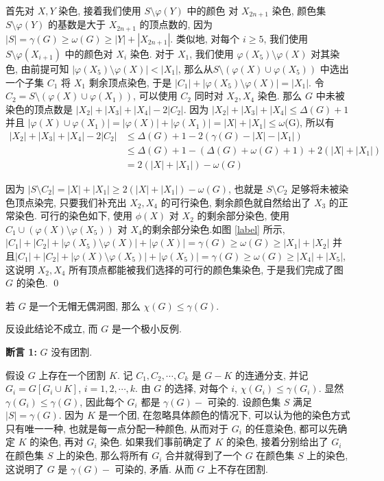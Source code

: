 \documentclass[12pt,a4paper]{article}%
\begin{document}
\begin{pf}
\begin{pf}
    首先对 $X,Y$ 染色, 接着我们使用 $S \setminus \varphi(Y)$ 中的颜色 对 $X_{2n+1}$ 染色, 颜色集 $S \setminus \varphi(Y)$ 的基数是大于 $X_{2n+1}$ 的顶点数的, 因为 $|S| = \gamma(G) \geq \omega(G) \geq |Y| + |X_{2n+1}|$. 类似地, 对每个 $i \geq 5$, 我们使用 $S \setminus \varphi(X_{i+1})$ 中的颜色对 $X_i$ 染色. 对于 $X_1$, 我们使用 $\varphi(X_5) \setminus \varphi(X)$ 对其染色, 由前提可知 $|\varphi(X_5) \setminus \varphi(X)| < |X_1|$, 那么从$S \setminus (\varphi(X) \cup \varphi(X_5))$ 中选出一个子集 $C_1$ 将 $X_1$ 剩余顶点染色, 于是 $|C_1| + |\varphi(X_5) \setminus \varphi(X)| = |X_1|$. 令 $C_2 = S \setminus (\varphi(X) \cup \varphi(X_1))$, 可以使用 $C_2$ 同时对 $X_2,X_4$ 染色. 那么 $G$ 中未被染色的顶点数是 $|X_2| + |X_3| + |X_4| - 2|C_2|$. 因为 $|X_2| + |X_3| + |X_4| \leq \Delta(G) + 1$ 并且 $|\varphi(X) \cup \varphi(X_1)| = |\varphi(X)| + |\varphi(X_1)| = |X| + |X_1| \leq \omega$(G), 所以有
    \begin{align*}
    |X_2|+|X_3|+|X_4|-2|C_2|    &\leq \Delta(G)+1-2(\gamma(G)-|X|-|X_1|)\\
                                &\leq \Delta(G)+1-(\Delta(G)+\omega(G)+1)+2(|X|+|X_1|)\\
                                &= 2(|X|+|X_1|)-\omega(G)
    \end{align*}
    
    因为 $|S \setminus C_2| = |X| + |X_1| \geq 2(|X| + |X_1|) - \omega(G)$, 也就是 $S \setminus C_2$ 足够将未被染色顶点染完, 只要我们补充出 $X_2,X_4$ 的可行染色, 剩余颜色就自然给出了 $X_3$ 的正常染色. 可行的染色如下, 使用 $\phi(X)$ 对 $X_2$ 的剩余部分染色, 使用 $C_1 \cup (\varphi(X)\setminus \varphi(X_5))$ 对 $X_4$的剩余部分染色.如图 \ref{label} 所示, $|C_1|+|C_2|+|\varphi(X_5)\setminus\varphi(X)|+|\varphi(X)|=\gamma(G)\ge\omega(G)\ge|X_1|+|X_2|$ 并且$|C_1|+|C_2|+|\varphi(X)\setminus\varphi(X_5)|+|\varphi(X_5)|=\gamma(G)\ge\omega(G)\ge|X_4|+|X_5|$, 这说明 $X_2,X_4$ 所有顶点都能被我们选择的可行的颜色集染色, 于是我们完成了图 $G$ 的染色. \qed
\end{pf}

\begin{thm}\label{thm44}
    若 $G$ 是一个无帽无偶洞图, 那么 $\chi(G) \leq \gamma(G)$.
\end{thm}
\begin{pf}
    反设此结论不成立, 而 $G$ 是一个极小反例.
    
    \textbf{断言 1:} \quad $G$ 没有团割.

    假设 $G$ 上存在一个团割 $K$. 记 $C_1,C_2,\cdots,C_k$ 是 $G-K$ 的连通分支, 并记 $G_i=G[G_i \cup K]$, $i = 1,2,\cdots,k$. 由 $G$ 的选择, 对每个 $i$, $\chi(G_i) \leq \gamma(G_i)$. 显然 $\gamma(G_i) \leq \gamma(G)$, 因此每个 $G_i$ 都是 $\gamma(G)-$ 可染的. 设颜色集 $S$ 满足 $|S| = \gamma(G)$. 因为 $K$ 是一个团, 在忽略具体颜色的情况下, 可以认为他的染色方式只有唯一一种, 也就是每一点分配一种颜色, 从而对于 $G_i$ 的任意染色, 都可以先确定 $K$ 的染色, 再对 $G_i$ 染色. 如果我们事前确定了 $K$ 的染色, 接着分别给出了 $G_i$ 在颜色集 $S$ 上的染色, 那么将所有 $G_i$ 合并就得到了一个 $G$ 在颜色集 $S$ 上的染色, 这说明了 $G$ 是 $\gamma(G)-$ 可染的, 矛盾. 从而 $G$ 上不存在团割.


\end{pf}
\end{pf}
\end{document}
